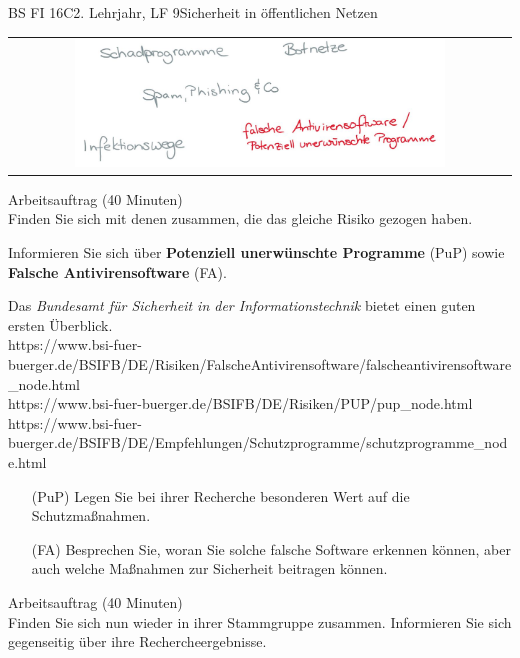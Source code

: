 \documentclass[oneside,openany,headings=optiontotoc,11pt,numbers=noenddot]{scrreprt}
\begin{document}
	\begin{worksheet}{BS FI 16C}{2. Lehrjahr, LF 9}{Sicherheit in öffentlichen Netzen}
		
		\begin{framed}
			\begin{tabular}{lcr}
				& \includegraphics[width=0.8\textwidth]{Bilder/AntivirUnwantedProg.jpg} & \\
			\end{tabular}
		\end{framed}
		\color{codegray}Arbeitsauftrag (40 Minuten)\\
		\color{black}
		Finden Sie sich mit denen zusammen, die das gleiche Risiko gezogen haben.
		\par
		\bigskip
		\noindent
		Informieren Sie sich über \textbf{Potenziell unerwünschte Programme} (PuP) sowie \textbf{Falsche Antivirensoftware} (FA).
		\par
		\bigskip
		\noindent
		Das \textit{Bundesamt für Sicherheit in der Informationstechnik} bietet einen guten ersten Überblick.\\
		\small{\color{codegray}https://www.bsi-fuer-buerger.de/BSIFB/DE/Risiken/FalscheAntivirensoftware/falscheantivirensoftware\_node.html\\
		https://www.bsi-fuer-buerger.de/BSIFB/DE/Risiken/PUP/pup\_node.html\\
		https://www.bsi-fuer-buerger.de/BSIFB/DE/Empfehlungen/Schutzprogramme/schutzprogramme\_node.html}
		\normalsize
		\begin{itemize}
			\item[(PuP)] Legen Sie bei ihrer Recherche besonderen Wert auf die Schutzmaßnahmen.
			\item[(FA)] Besprechen Sie, woran Sie solche falsche Software erkennen können, aber auch welche Maßnahmen zur Sicherheit beitragen können.
		\end{itemize}
		\par
		\bigskip
		\noindent
		
		\color{codegray}Arbeitsauftrag (40 Minuten)\\
		\color{black}
		Finden Sie sich nun wieder in ihrer Stammgruppe zusammen. Informieren Sie sich gegenseitig über ihre Rechercheergebnisse.
		

\end{worksheet}
\end{document}
